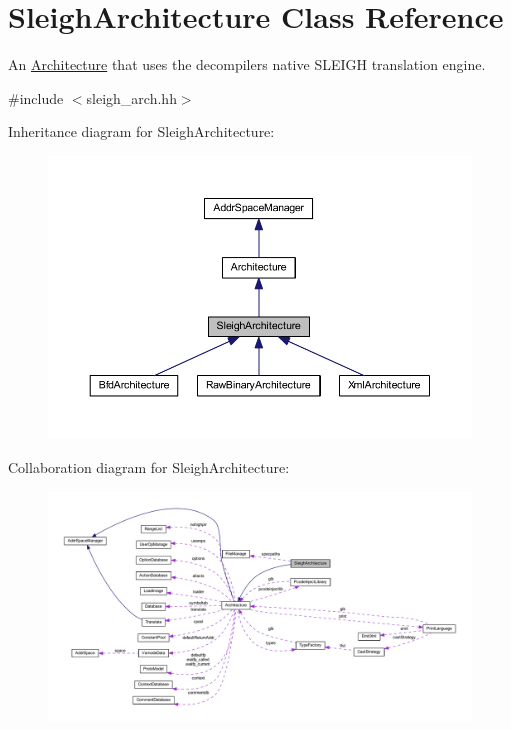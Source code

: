 \hypertarget{class_sleigh_architecture}{}\section{Sleigh\+Architecture Class Reference}
\label{class_sleigh_architecture}


An \mbox{\hyperlink{class_architecture}{Architecture}} that uses the decompiler\textquotesingle{}s native S\+L\+E\+I\+GH translation engine.  




{\ttfamily \#include $<$sleigh\+\_\+arch.\+hh$>$}



Inheritance diagram for Sleigh\+Architecture\+:
\nopagebreak
\begin{figure}[H]
\begin{center}
\leavevmode
\includegraphics[width=350pt]{class_sleigh_architecture__inherit__graph}
\end{center}
\end{figure}


Collaboration diagram for Sleigh\+Architecture\+:
\nopagebreak
\begin{figure}[H]
\begin{center}
\leavevmode
\includegraphics[width=350pt]{class_sleigh_architecture__coll__graph}
\end{center}
\end{figure}
